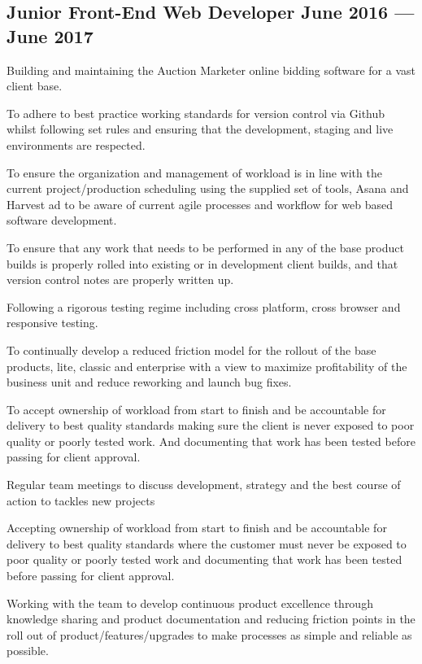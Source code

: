 \subsection{{Junior Front-End Web Developer \hfill June 2016 --- June 2017}}
\begin{zitemize}
\item Building and maintaining the Auction Marketer online bidding software for a vast client base.
\item To adhere to best practice working standards for version control via Github whilst following set rules and ensuring that the development, staging and live environments are respected.
\item To ensure the organization and management of workload is in line with the current project/production scheduling using the supplied set of tools, Asana and Harvest ad to be aware of current agile processes and workflow for web based software development.
\item To ensure that any work that needs to be performed in any of the base product builds is properly rolled into existing or in development client builds, and that version control notes are properly written up.
\item Following a rigorous testing regime including cross platform, cross browser and responsive testing.
\item To continually develop a reduced friction model for the rollout of the base products, lite, classic and enterprise with a view to maximize profitability of the business unit and reduce reworking and launch bug fixes.
\item To accept ownership of workload from start to finish and be accountable for delivery to best quality standards making sure the client is never exposed to poor quality or poorly tested work. And documenting that work has been tested before passing for client approval.
\item Regular team meetings to discuss development, strategy and the best course of action to tackles new projects
\item Accepting ownership of workload from start to finish and be accountable for delivery to best quality standards where the customer must never be exposed to poor quality or poorly tested work and documenting that work has been tested before passing for client approval.
\item Working with the team to develop continuous product excellence through knowledge sharing and product documentation and reducing friction points in the roll out of product/features/upgrades to make processes as simple and reliable as possible.

\end{zitemize}
